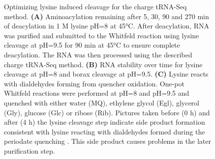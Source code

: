 \begin{figure}[ht]
    \centering
    \caption[Optimizing lysine induced cleavage.]{
    Optimizing lysine induced cleavage for the charge tRNA-Seq method.
    \textbf{(A)} Aminoacylation remaining after 5, 30, 90 and 270 min of deacylation in 1 M lysine pH=8 at 45°C.
    After deacylation, RNA was purified and submitted to the Whitfeld reaction using lysine cleavage at pH=9.5 for 90 min at 45°C to ensure complete deacylation.
    The RNA was then processed using the described charge tRNA-Seq method.
    \textbf{(B)} RNA stability over time for lysine cleavage at pH=8 and borax cleavage at pH=9.5.
    \textbf{(C)} Lysine reacts with dialdehydes forming from quencher oxidation.
    One-pot Whitfeld reactions were performed at pH=8 and pH=9.5 and quenched with either water (MQ), ethylene glycol (Egl), glycerol (Gly), glucose (Glc) or ribose (Rib).
    Pictures taken before (0 h) and after (4 h) the lysine cleavage step indicate side product formation consistent with lysine reacting with dialdehydes formed during the periodate quenching \cite{Saraiva2006-gw}.
    This side product causes problems in the later purification step.
    }
    \label{ch5:figsupp:f2S1}
\end{figure}


